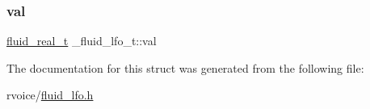 \mbox{\label{struct__fluid__lfo__t_a56f1a08c37957fc3be87560d184a73b5}} 
\subsubsection{\texorpdfstring{val}{val}}
{\footnotesize\ttfamily \hyperlink{fluidsynth__priv_8h_a9e96f0917747b69cabb7c671bc693dbb}{fluid\+\_\+real\+\_\+t} \+\_\+fluid\+\_\+lfo\+\_\+t\+::val}



The documentation for this struct was generated from the following file\+:\begin{DoxyCompactItemize}
\item 
rvoice/\hyperlink{fluid__lfo_8h}{fluid\+\_\+lfo.\+h}\end{DoxyCompactItemize}
